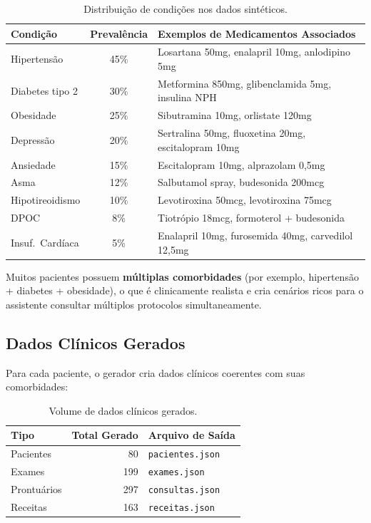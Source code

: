 \begin{table}[H]
\centering
\caption{Distribuição de condições nos dados sintéticos.}
\label{tab:distribuicao_condicoes}
\begin{tabularx}{\textwidth}{l c X}
\toprule
\textbf{Condição} & \textbf{Prevalência} & \textbf{Exemplos de Medicamentos Associados} \\
\midrule
Hipertensão         & 45\% & Losartana 50mg, enalapril 10mg, anlodipino 5mg \\
Diabetes tipo 2     & 30\% & Metformina 850mg, glibenclamida 5mg, insulina NPH \\
Obesidade           & 25\% & Sibutramina 10mg, orlistate 120mg \\
Depressão           & 20\% & Sertralina 50mg, fluoxetina 20mg, escitalopram 10mg \\
Ansiedade           & 15\% & Escitalopram 10mg, alprazolam 0,5mg \\
Asma                & 12\% & Salbutamol spray, budesonida 200mcg \\
Hipotireoidismo     & 10\% & Levotiroxina 50mcg, levotiroxina 75mcg \\
DPOC                & 8\%  & Tiotrópio 18mcg, formoterol + budesonida \\
Insuf.\ Cardíaca    & 5\%  & Enalapril 10mg, furosemida 40mg, carvedilol 12,5mg \\
\bottomrule
\end{tabularx}
\end{table}

Muitos pacientes possuem \textbf{múltiplas comorbidades} (por exemplo, hipertensão + diabetes + obesidade), o que é clinicamente realista e cria cenários ricos para o assistente consultar múltiplos protocolos simultaneamente.

\subsection{Dados Clínicos Gerados}

Para cada paciente, o gerador cria dados clínicos coerentes com suas comorbidades:

\begin{table}[H]
\centering
\caption{Volume de dados clínicos gerados.}
\label{tab:volume_dados}
\begin{tabular}{l r l}
\toprule
\textbf{Tipo} & \textbf{Total Gerado} & \textbf{Arquivo de Saída} \\
\midrule
Pacientes     & 80   & \texttt{pacientes.json} \\
Exames        & 199  & \texttt{exames.json} \\
Prontuários   & 297  & \texttt{consultas.json} \\
Receitas      & 163  & \texttt{receitas.json} \\
\bottomrule
\end{tabular}
\end{table}

